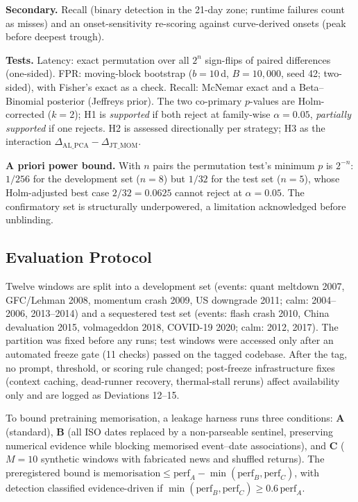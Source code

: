 \documentclass[10pt,a4paper]{article}
\begin{document}
\textbf{Secondary.} Recall (binary detection in the 21-day zone; runtime
failures count as misses) and an onset-sensitivity re-scoring against
curve-derived onsets (peak before deepest trough).

\textbf{Tests.} Latency: exact permutation over all $2^n$ sign-flips of paired
differences (one-sided). FPR: moving-block bootstrap ($b = 10$\,d,
$B = 10{,}000$, seed 42; two-sided), with Fisher's exact as a check. Recall:
McNemar exact and a Beta--Binomial posterior (Jeffreys prior). The two
co-primary $p$-values are Holm-corrected ($k = 2$); H1 is \emph{supported} if
both reject at family-wise $\alpha = 0.05$, \emph{partially supported} if one
rejects. H2 is assessed directionally per strategy; H3 as the interaction
$\Delta_\text{AL\_PCA} - \Delta_\text{JT\_MOM}$.

\textbf{A priori power bound.} With $n$ pairs the permutation test's minimum
$p$ is $2^{-n}$: $1/256$ for the development set ($n = 8$) but $1/32$ for the
test set ($n = 5$), whose Holm-adjusted best case $2/32 = 0.0625$ cannot reject
at $\alpha = 0.05$. The confirmatory set is structurally underpowered, a
limitation acknowledged before unblinding.

\subsection{Evaluation Protocol}\label{sec:protocol}

Twelve windows are split into a development set (events: quant meltdown 2007,
GFC/Lehman 2008, momentum crash 2009, US downgrade 2011; calm: 2004--2006,
2013--2014) and a sequestered test set (events: flash crash 2010, China
devaluation 2015, volmageddon 2018, COVID-19 2020; calm: 2012, 2017). The
partition was fixed before any runs; test windows were accessed only after an
automated freeze gate (11 checks) passed on the tagged codebase. After the tag,
no prompt, threshold, or scoring rule changed; post-freeze infrastructure fixes
(context caching, dead-runner recovery, thermal-stall reruns) affect
availability only and are logged as Deviations 12--15.

To bound pretraining memorisation, a leakage harness runs three conditions:
\textbf{A} (standard), \textbf{B} (all ISO dates replaced by a non-parseable
sentinel, preserving numerical evidence while blocking memorised event--date
associations), and \textbf{C} ($M = 10$ synthetic windows with fabricated news
and shuffled returns). The preregistered bound is
$\text{memorisation} \leq \text{perf}_A - \min(\text{perf}_B, \text{perf}_C)$,
with detection classified evidence-driven if
$\min(\text{perf}_B, \text{perf}_C) \geq 0.6\,\text{perf}_A$.
\end{document}
